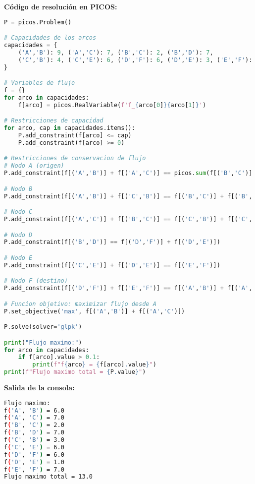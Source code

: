 \documentclass[12pt]{article}
\begin{document}
\textbf{Código de resolución en PICOS:}
\begin{lstlisting}[language=Python]
P = picos.Problem()

# Capacidades de los arcos
capacidades = {
    ('A','B'): 9, ('A','C'): 7, ('B','C'): 2, ('B','D'): 7,
    ('C','B'): 4, ('C','E'): 6, ('D','F'): 6, ('D','E'): 3, ('E','F'): 9
}

# Variables de flujo
f = {}
for arco in capacidades:
    f[arco] = picos.RealVariable(f'f_{arco[0]}{arco[1]}')

# Restricciones de capacidad
for arco, cap in capacidades.items():
    P.add_constraint(f[arco] <= cap)
    P.add_constraint(f[arco] >= 0)

# Restricciones de conservacion de flujo
# Nodo A (origen)
P.add_constraint(f[('A','B')] + f[('A','C')] == picos.sum(f[('B','C')] + f[('C','B')] + f[('D','E')] + f[('E','F')]))

# Nodo B
P.add_constraint(f[('A','B')] + f[('C','B')] == f[('B','C')] + f[('B','D')])

# Nodo C
P.add_constraint(f[('A','C')] + f[('B','C')] == f[('C','B')] + f[('C','E')])

# Nodo D
P.add_constraint(f[('B','D')] == f[('D','F')] + f[('D','E')])

# Nodo E
P.add_constraint(f[('C','E')] + f[('D','E')] == f[('E','F')])

# Nodo F (destino)
P.add_constraint(f[('D','F')] + f[('E','F')] == f[('A','B')] + f[('A','C')])

# Funcion objetivo: maximizar flujo desde A
P.set_objective('max', f[('A','B')] + f[('A','C')])

P.solve(solver='glpk')

print("Flujo maximo:")
for arco in capacidades:
    if f[arco].value > 0.1:
        print(f"f{arco} = {f[arco].value}")
print(f"Flujo maximo total = {P.value}")
\end{lstlisting}

\textbf{Salida de la consola:}
\begin{lstlisting}[language=bash,backgroundcolor=\color{black},basicstyle=\color{white}\ttfamily,numbers=none]
Flujo maximo:
f('A', 'B') = 6.0
f('A', 'C') = 7.0
f('B', 'C') = 2.0
f('B', 'D') = 7.0
f('C', 'B') = 3.0
f('C', 'E') = 6.0
f('D', 'F') = 6.0
f('D', 'E') = 1.0
f('E', 'F') = 7.0
Flujo maximo total = 13.0
\end{lstlisting}
\end{document}

